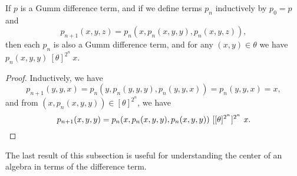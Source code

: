\documentclass[letterpaper,11pt]{article}
\begin{document}
\begin{prop} If $p$ is a Gumm difference term, and if we define terms $p_n$ inductively by $p_0 = p$ and
\[
p_{n+1}(x,y,z) = p_n(x,p_n(x,y,y),p_n(x,y,z)),
\]
then each $p_n$ is also a Gumm difference term, and for any $(x,y) \in \theta$ we have $p_n(x,y,y)\ [\theta]^{2^n}\ x$.
\end{prop}
\begin{proof} Inductively, we have
\[
p_{n+1}(y,y,x) = p_n(y,p_n(y,y,y),p_n(y,y,x)) = p_n(y,y,x) = x,
\]
and from $(x,p_n(x,y,y)) \in [\theta]^{2^n}$, we have
\[
p_{n+1}(x,y,y) = p_n(x,p_n(x,y,y),p_n(x,y,y))\ [[\theta]^{2^n}]^{2^n}\ x.\qedhere
\]
\end{proof}

The last result of this subsection is useful for understanding the center of an algebra in terms of the difference term.
\end{document}
